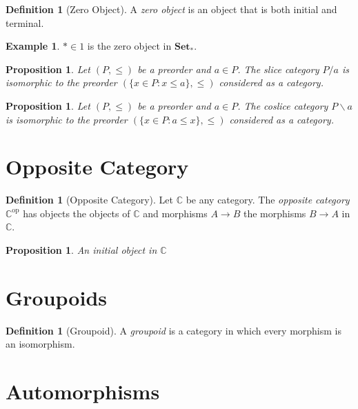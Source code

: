 \documentclass{article}
\newtheorem{proposition}[axiom]{Proposition}
\theoremstyle{definition}
\newtheorem{definition}[axiom]{Definition}
\newtheorem{example}[axiom]{Example}
\begin{document}
\begin{definition}[Zero Object]
    A \emph{zero object} is an object that is both initial and terminal.
\end{definition}

\begin{example}
    $* \in 1$ is the zero object in $\mathbf{Set}_*$.
\end{example}

\begin{proposition}
    Let $(P, \leq)$ be a preorder and $a \in P$. The slice category $P/a$ is isomorphic
    to the preorder $(\{ x \in P : x \leq a \}, \leq)$ considered as a category.
\end{proposition}

\begin{proposition}
    Let $(P, \leq)$ be a preorder and $a \in P$. The coslice category $P \backslash a$ is isomorphic
    to the preorder $(\{ x \in P : a \leq x \}, \leq)$ considered as a category.
\end{proposition}

\section{Opposite Category}

\begin{definition}[Opposite Category]
    Let $\mathbb{C}$ be any category. The \emph{opposite category} $\mathbb{C}^{\mathrm{op}}$
    has objects the objects of $\mathbb{C}$ and morphisms $A \rightarrow B$ the morphisms
    $B \rightarrow A$ in $\mathbb{C}$.
\end{definition}

\begin{proposition}
    An initial object in $\mathbb{C}$ 
\end{proposition}
\section{Groupoids}

\begin{definition}[Groupoid]
    A \emph{groupoid} is a category in which every morphism is an isomorphism.
\end{definition}

\section{Automorphisms}
\end{document}
